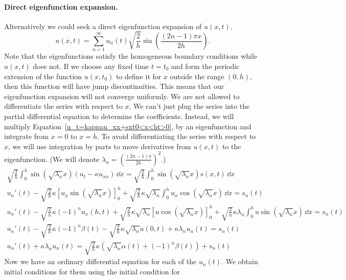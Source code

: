 \paragraph{Direct eigenfunction expansion.}
Alternatively we could seek a direct eigenfunction expansion of $u(x,t)$.
\[
u(x,t) = \sum_{n=1}^\infty u_n(t) \sqrt{ \frac{2}{h} }
\sin \left( \frac{(2n-1) \pi x}{2 h} \right).
\]
Note that the eigenfunctions satisfy the homogeneous boundary conditions
while $u(x,t)$ does not.  If we choose any fixed time $t = t_0$ and form the 
periodic extension of the function $u(x,t_0)$ to define it for $x$ outside
the range $(0,h)$, then this function will have jump discontinuities.
This means that our eigenfunction expansion will not converge uniformly.
We are not allowed to differentiate the series with respect to $x$.  
We can't just plug the series into the partial differential equation to 
determine the coefficients.  Instead, we will multiply 
Equation~\ref{u_t=kappau_xx+sxt0<x<ht>0},
by an eigenfunction
and integrate from $x = 0$ to $x = h$.  To avoid differentiating the 
series with respect to $x$, we will use integration by parts to move 
derivatives from $u(x,t)$ to the eigenfunction.  (We will denote
$\lambda_n = \left( \frac{(2n-1) \pi}{2 h} \right)^2$.)
\begin{gather*}
  \sqrt{ \frac{2}{h} } \int_0^h \sin( \sqrt{\lambda_n} x ) 
  ( u_t - \kappa u_{x x} ) \,\dd x 
  =  \sqrt{ \frac{2}{h} } \int_0^h \sin( \sqrt{\lambda_n} x ) 
  s(x,t) \,\dd x\\
  u_n'(t) - \sqrt{ \frac{2}{h} } \kappa 
  \left[ u_x \sin( \sqrt{\lambda_n} x ) \right]_0^h
  + \sqrt{ \frac{2}{h} } \kappa \sqrt{\lambda_n}
  \int_0^h u_x \cos( \sqrt{\lambda_n} x ) \,\dd x 
  = s_n(t) \\
  u_n'(t) - \sqrt{ \frac{2}{h} } \kappa (-1)^n u_x(h,t)
  + \sqrt{ \frac{2}{h} } \kappa \sqrt{\lambda_n}
  \left[ u \cos( \sqrt{\lambda_n} x ) \right]_0^h
  + \sqrt{ \frac{2}{h} } \kappa \lambda_n
  \int_0^h u \sin( \sqrt{\lambda_n} x ) \,\dd x 
  = s_n(t) \\
  u_n'(t) - \sqrt{ \frac{2}{h} } \kappa (-1)^n \beta(t)
  - \sqrt{ \frac{2}{h} } \kappa \sqrt{\lambda_n} u(0,t) 
  + \kappa \lambda_n u_n(t) 
  = s_n(t) \\
  u_n'(t) + \kappa \lambda_n u_n(t) 
  = \sqrt{ \frac{2}{h} } \kappa \left( \sqrt{\lambda_n} \alpha(t) 
    + (-1)^n \beta(t) \right) + s_n(t)
\end{gather*}
Now we have an ordinary differential equation for each of the $u_n(t)$.
We obtain initial conditions for them using the initial condition for 
